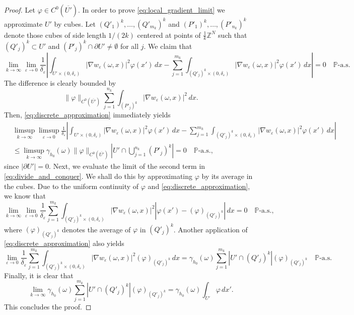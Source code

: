 \documentclass{article}
\numberwithin{equation}{section}
\theoremstyle{definition}
\theoremstyle{remark}
\begin{document}
\begin{proof}
    Let $\varphi \in C^0(\overline{U'})$. In order to prove \eqref{eq:local_gradient_limit} we approximate $U'$ by cubes. Let $(Q'_1)^k, \dots, (Q'_{m_k})^k$ and $(P'_1)^k, \dots, (P'_{n_k})^k$ denote those cubes of side length $1/(2k)$ centered at points of $\frac{1}{k}\mathbb{Z}^N$ such that $(Q'_j)^k \subset U'$ and $(P'_j)^k \cap \partial U' \neq \emptyset$ for all $j$. We claim that
    \begin{equation} \label{eq:divide_and_conquer}
        \lim_{k \to \infty} \lim_{\varepsilon \to 0} \frac{1}{\delta_\varepsilon}\left|\int_{U' \times (0, \delta_\varepsilon)} |\nabla w_\varepsilon(\omega, x)|^2 \varphi(x') \, dx - \sum_{j = 1}^{m_k} \int_{(Q'_j)^k \times (0, \delta_\varepsilon)} |\nabla w_\varepsilon(\omega, x)|^2 \varphi(x') \, dx \right| = 0 \quad \mathbb{P}\text{-a.s.}
    \end{equation}
    The difference is clearly bounded by
    \[
    \|\varphi\|_{C^0({\overline{U'}})} \sum_{j = 1}^{n_k} \int_{(P'_j)^k} |\nabla w_\varepsilon(\omega, x)|^2 \, dx.
    \]
    Then, \eqref{eq:discrete_approximation} immediately yields
    \begin{align*}
        &\limsup_{k \to \infty} \limsup_{\varepsilon \to 0} \frac{1}{\delta_\varepsilon} \left|\int_{U' \times (0, \delta_\varepsilon)} |\nabla w_\varepsilon(\omega, x)|^2 \varphi(x') \, dx - \sum_{j = 1}^{m_k} \int_{(Q'_j)^k \times (0, \delta_\varepsilon)} |\nabla w_\varepsilon(\omega, x)|^2 \varphi(x') \, dx \right| \\
        &\le \limsup_{k \to \infty} \gamma_{h_0}(\omega) \|\varphi\|_{C^0(\overline{U'})}\left|U' \cap \bigcup_{j = 1}^{n_k} (P'_j)^k \right| = 0 \quad \mathbb{P}\text{-a.s.,}
    \end{align*}
    since $|\partial U'| = 0$. Next, we evaluate the limit of the second term in \eqref{eq:divide_and_conquer}. We shall do this by approximating $\varphi$ by its average in the cubes. Due to the uniform continuity of $\varphi$ and \eqref{eq:discrete_approximation}, we know that
    \[
    \lim_{k \to \infty} \lim_{\varepsilon \to 0} \frac{1}{\delta_\varepsilon} \sum_{j = 1}^{m_k} \int_{(Q'_j)^k \times (0, \delta_\varepsilon)} |\nabla w_\varepsilon(\omega, x)|^2 |\varphi(x') - (\varphi)_{(Q'_j)^k}| \, dx = 0 \quad \mathbb{P}\text{-a.s.},
    \]
    where $(\varphi)_{(Q'_j)^k}$ denotes the average of $\varphi$ in $(Q'_j)^k$. Another application of \eqref{eq:discrete_approximation} also yields
    \[
    \lim_{\varepsilon \to 0} \frac{1}{\delta_\varepsilon} \sum_{j = 1}^{m_k} \int_{(Q'_j)^k \times (0, \delta_\varepsilon)} |\nabla w_\varepsilon(\omega, x)|^2 (\varphi)_{(Q'_j)^k} \, dx = \gamma_{h_0}(\omega) \sum_{j = 1}^{m_k} |U' \cap (Q'_j)^k| (\varphi)_{(Q'_j)^k} \quad \mathbb{P}\text{-a.s.}
    \]
    Finally, it is clear that
    \[
    \lim_{k \to \infty} \gamma_{h_0}(\omega) \sum_{j = 1}^{m_k} |U' \cap (Q'_j)^k| (\varphi)_{(Q'_j)^k} = \gamma_{h_0}(\omega) \int_{U'} \varphi \, dx'.
    \]
    This concludes the proof.
\end{proof}
\end{document}
